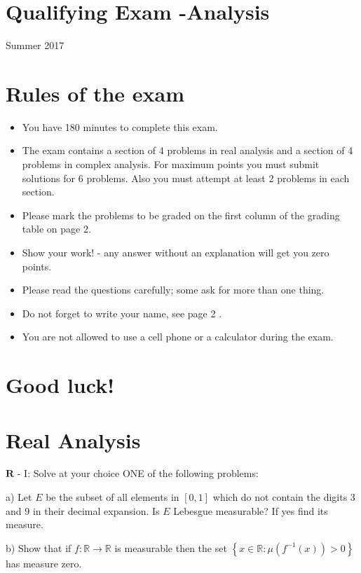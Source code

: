 \documentclass[10pt]{article}
\begin{document}
\section*{Qualifying Exam -Analysis }
Summer 2017

\section{Rules of the exam}
\begin{itemize}
  \item You have 180 minutes to complete this exam.

  \item The exam contains a section of 4 problems in real analysis and a section of 4 problems in complex analysis. For maximum points you must submit solutions for 6 problems. Also you must attempt at least 2 problems in each section.

  \item Please mark the problems to be graded on the first column of the grading table on page $2 .$

  \item Show your work! - any answer without an explanation will get you zero points.

  \item Please read the questions carefully; some ask for more than one thing.

  \item Do not forget to write your name, see page 2 .

  \item You are not allowed to use a cell phone or a calculator during the exam.

\end{itemize}
\section{Good luck!}
\section{Real Analysis}
$\mathbf{R}$ - I: Solve at your choice ONE of the following problems:

a) Let $E$ be the subset of all elements in $[0,1]$ which do not contain the digits 3 and 9 in their decimal expansion. Is $E$ Lebesgue measurable? If yes find its measure.

b) Show that if $f: \mathbb{R} \rightarrow \mathbb{R}$ is measurable then the set $\left\{x \in \mathbb{R}: \mu\left(f^{-1}(x)\right)>0\right\}$ has measure zero.
\end{document}
